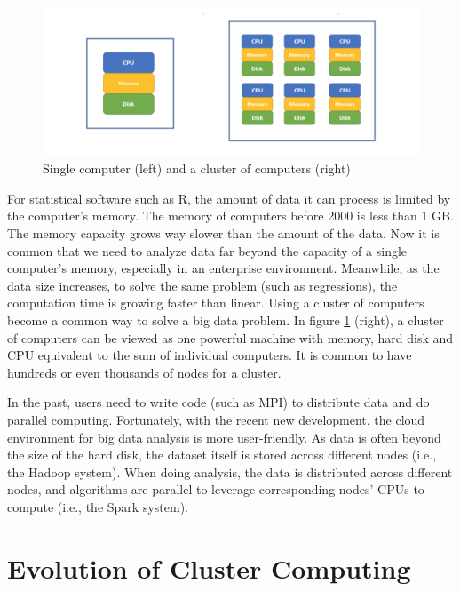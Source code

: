 \documentclass[
  12pt,
]{krantz}
\begin{document}
\begin{figure}

{\centering \includegraphics[width=1\linewidth]{images/cluster} 

}

\caption{Single computer (left) and a cluster of computers (right)}\label{fig:sparkcluster}
\end{figure}

For statistical software such as R, the amount of data it can process is limited by the computer's memory. The memory of computers before 2000 is less than 1 GB. The memory capacity grows way slower than the amount of the data. Now it is common that we need to analyze data far beyond the capacity of a single computer's memory, especially in an enterprise environment. Meanwhile, as the data size increases, to solve the same problem (such as regressions), the computation time is growing faster than linear. Using a cluster of computers become a common way to solve a big data problem. In figure \ref{fig:sparkcluster} (right), a cluster of computers can be viewed as one powerful machine with memory, hard disk and CPU equivalent to the sum of individual computers. It is common to have hundreds or even thousands of nodes for a cluster.

In the past, users need to write code (such as MPI) to distribute data and do parallel computing. Fortunately, with the recent new development, the cloud environment for big data analysis is more user-friendly. As data is often beyond the size of the hard disk, the dataset itself is stored across different nodes (i.e., the Hadoop system). When doing analysis, the data is distributed across different nodes, and algorithms are parallel to leverage corresponding nodes' CPUs to compute (i.e., the Spark system).

\hypertarget{evolution-of-cluster-computing}{%
\section{Evolution of Cluster Computing}\label{evolution-of-cluster-computing}}
\end{document}
